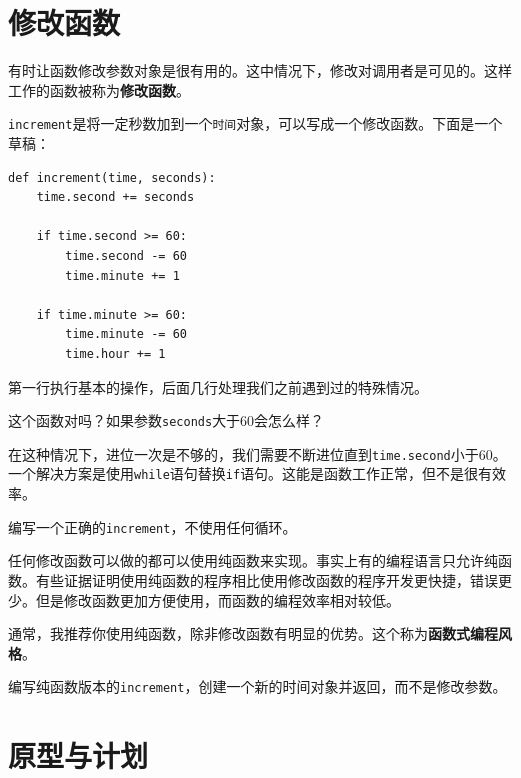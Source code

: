 \section{修改函数}
\label{增量}


有时让函数修改参数对象是很有用的。这中情况下，修改对调用者是可见的。这样工作的函数被称为{\bf 修改函数}。


{\tt increment}是将一定秒数加到一个{\tt 时间}对象，可以写成一个修改函数。下面是一个草稿：

\beforeverb
\begin{verbatim}
def increment(time, seconds):
    time.second += seconds

    if time.second >= 60:
        time.second -= 60
        time.minute += 1

    if time.minute >= 60:
        time.minute -= 60
        time.hour += 1
\end{verbatim}
\afterverb
%
第一行执行基本的操作，后面几行处理我们之前遇到过的特殊情况。


这个函数对吗？如果参数{\tt seconds}大于60会怎么样？

在这种情况下，进位一次是不够的，我们需要不断进位直到{\tt time.second}小于60。一个解决方案是使用{\tt while}语句替换{\tt if}语句。这能是函数工作正常，但不是很有效率。

\begin{ex}
编写一个正确的{\tt increment}，不使用任何循环。
\end{ex}

任何修改函数可以做的都可以使用纯函数来实现。事实上有的编程语言只允许纯函数。有些证据证明使用纯函数的程序相比使用修改函数的程序开发更快捷，错误更少。但是修改函数更加方便使用，而函数的编程效率相对较低。

通常，我推荐你使用纯函数，除非修改函数有明显的优势。这个称为{\bf 函数式编程风格}。



\begin{ex}
编写纯函数版本的{\tt increment}，创建一个新的时间对象并返回，而不是修改参数。
\end{ex}


\section{原型与计划}
\label{原型}

